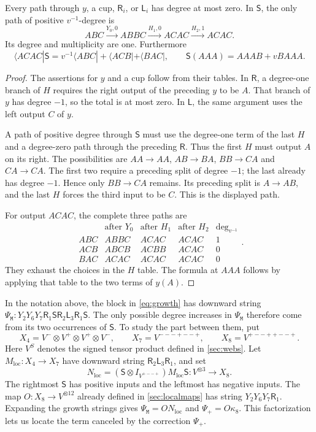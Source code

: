 \documentclass[a4paper,11pt]{amsart}
\newcommand{\wordmiddle}{\mathtt{M}}
\newcommand{\middlemap}{{\Psi}_{{\wordmiddle}}}
\newcommand{\createmap}{{\Psi}_+}
\newcommand{\tpar}{v}
\newcommand{\vpar}{{\tpar^{-1}}}
\numberwithin{equation}{subsection}
\theoremstyle{plain}
\theoremstyle{definition}
\theoremstyle{remark}
\begin{document}
\begin{lemma}\label{loc:nonpositive}
Every path through $y$, a cup, $\mathsf R_i$, or $\mathsf L_i$ has degree at most
zero. In $\mathsf S$, the only path of positive $\vpar$-degree is
\[
 ABC\xrightarrow{Y_0,0}ABBC
 \xrightarrow{H_1,0}ACAC\xrightarrow{H_2,1}ACAC.
\]
Its degree and multiplicity are one. Furthermore
\begin{equation}\label{loc:Srow}
 \langle ACAC|\mathsf S=\tpar^{-1}\langle ABC|+\langle ACB|+\langle BAC|,
 \qquad \mathsf S(AAA)=AAAB+\tpar BAAA.
\end{equation}
\end{lemma}

\begin{proof}
The assertions for $y$ and a cup follow from their tables. In
$\mathsf R$, a degree-one branch of $H$ requires the right output of
the preceding $y$ to be $A$. That branch of $y$ has degree $-1$, so
the total is at most zero. In $\mathsf L$, the same argument uses the
left output $C$ of $y$.

A path of positive degree through $\mathsf S$ must use the degree-one term
of the last $H$ and a degree-zero path through the preceding
$\mathsf R$. Thus the first $H$ must output $A$ on its right.
The possibilities are $AA\to AA$, $AB\to BA$, $BB\to CA$ and
$CA\to CA$. The first two require a preceding split of degree $-1$;
the last already has degree $-1$. Hence only $BB\to CA$ remains.
Its preceding split is $A\to AB$, and the last $H$ forces the third
input to be $C$. This is the displayed path.

For output $ACAC$, the complete three paths are
\[
\begin{array}{c|ccc|r}
 &\text{after }Y_0&\text{after }H_1&\text{after }H_2&\deg_{\vpar}\\\hline
ABC&ABBC&ACAC&ACAC&1\\
ACB&ABCB&ACBB&ACAC&0\\
BAC&ACAC&ACAC&ACAC&0
\end{array}.
\]
They exhaust the choices in the $H$ table. The formula at $AAA$
follows by applying that table to the two terms of $y(A)$.
\end{proof}

In the notation above, the block in \autoref{eq:growth} has downward string
$\middlemap:Y_2Y_6Y_7\mathsf R_1\mathsf S
\mathsf R_2\mathsf L_3\mathsf R_1\mathsf S$.
The only possible degree increases in $\middlemap$ therefore come from its two
occurrences of $\mathsf S$. To study the part between them, put
\[
X_4=V^-\otimes V^+\otimes V^+\otimes V^-,\qquad
X_7=V^{---+--+},\qquad X_8=V^{+--++--+}.
\]
Here $V^S$ denotes the signed tensor product defined in
\autoref{sec:webs}.
Let $M_{\mathrm{loc}}:X_4\to X_7$ have downward string
$\mathsf R_2\mathsf L_3\mathsf R_1$, and set
\[
N_{\mathrm{loc}}=(\mathsf S\otimes I_{V^{+--+}})
M_{\mathrm{loc}}\mathsf S:V^{\otimes3}\to X_8.
\]
The rightmost $\mathsf S$ has positive inputs and the leftmost has
negative inputs. The map $O:X_8\to V^{\otimes12}$ already defined in
\autoref{sec:localmaps} has string $Y_2Y_6Y_7\mathsf R_1$.
Expanding the growth strings gives
$\middlemap=ON_{\mathrm{loc}}$ and $\createmap=O\kappa_8$. This factorization lets us locate
the term canceled by the correction $\createmap$.
\end{document}
